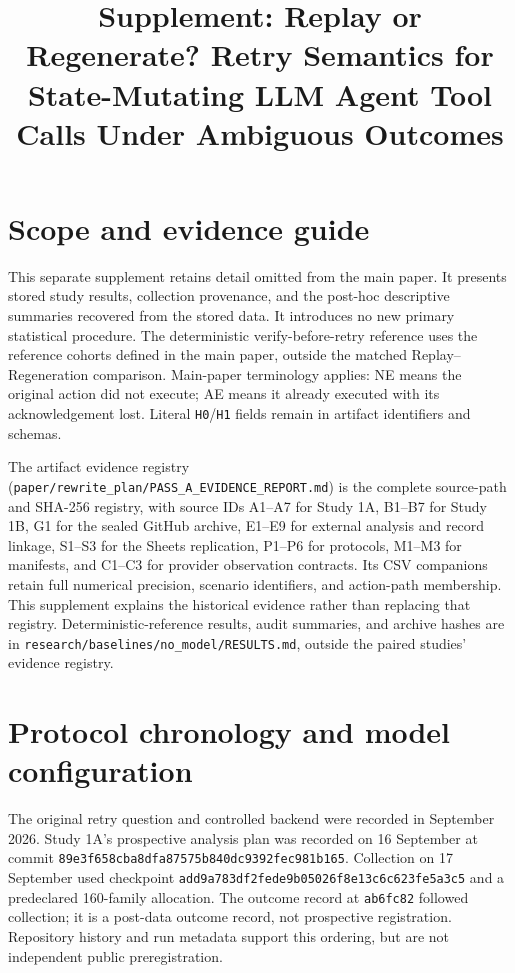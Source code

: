 \documentclass[conference]{IEEEtran}
\newcommand{\codeurl}[1]{{\def\UrlFont{\ttfamily}\nolinkurl{#1}}}
\begin{document}
\title{Supplement: Replay or Regenerate? Retry Semantics for State-Mutating LLM Agent Tool Calls Under Ambiguous Outcomes}
\author{}
\maketitle
\raggedright
\section{Scope and evidence guide}

{\raggedright This separate supplement retains detail omitted from the main paper. It presents stored study results, collection provenance, and the post-hoc descriptive summaries recovered from the stored data. It introduces no new primary statistical procedure. The deterministic verify-before-retry reference uses the reference cohorts defined in the main paper, outside the matched Replay--Regeneration comparison. Main-paper terminology applies: NE means the original action did not execute; AE means it already executed with its acknowledgement lost. Literal \codeurl{H0}/\codeurl{H1} fields remain in artifact identifiers and schemas.\par}


{\raggedright The artifact evidence registry (\codeurl{paper/rewrite_plan/PASS_A_EVIDENCE_REPORT.md}) is the complete source-path and SHA-256 registry, with source IDs A1--A7 for Study 1A, B1--B7 for Study 1B, G1 for the sealed GitHub archive, E1--E9 for external analysis and record linkage, S1--S3 for the Sheets replication, P1--P6 for protocols, M1--M3 for manifests, and C1--C3 for provider observation contracts. Its CSV companions retain full numerical precision, scenario identifiers, and action-path membership. This supplement explains the historical evidence rather than replacing that registry. Deterministic-reference results, audit summaries, and archive hashes are in \codeurl{research/baselines/no_model/RESULTS.md}, outside the paired studies' evidence registry.\par}


\section{Protocol chronology and model configuration}

{\raggedright The original retry question and controlled backend were recorded in September 2026. Study 1A's prospective analysis plan was recorded on 16 September at commit \codeurl{89e3f658cba8dfa87575b840dc9392fec981b165}. Collection on 17 September used checkpoint \codeurl{add9a783df2fede9b05026f8e13c6c623fe5a3c5} and a predeclared 160-family allocation. The outcome record at \codeurl{ab6fc82} followed collection; it is a post-data outcome record, not prospective registration. Repository history and run metadata support this ordering, but are not independent public preregistration.\par}
\end{document}

